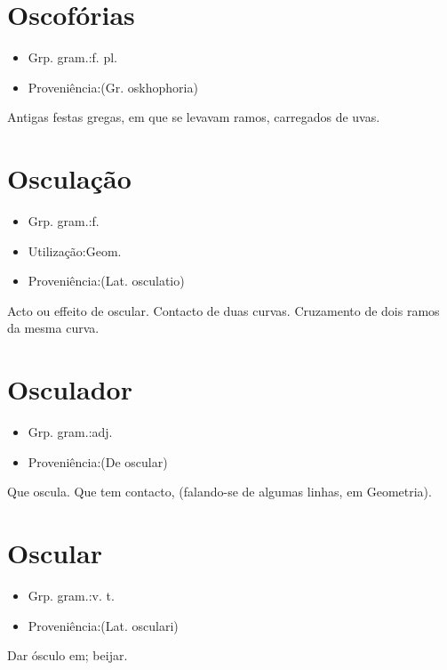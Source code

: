 \section{Oscofórias}
\begin{itemize}
\item {Grp. gram.:f. pl.}
\end{itemize}
\begin{itemize}
\item {Proveniência:(Gr. \textunderscore oskhophoria\textunderscore )}
\end{itemize}
Antigas festas gregas, em que se levavam ramos, carregados de uvas.
\section{Osculação}
\begin{itemize}
\item {Grp. gram.:f.}
\end{itemize}
\begin{itemize}
\item {Utilização:Geom.}
\end{itemize}
\begin{itemize}
\item {Proveniência:(Lat. \textunderscore osculatio\textunderscore )}
\end{itemize}
Acto ou effeito de oscular.
Contacto de duas curvas.
Cruzamento de dois ramos da mesma curva.
\section{Osculador}
\begin{itemize}
\item {Grp. gram.:adj.}
\end{itemize}
\begin{itemize}
\item {Proveniência:(De \textunderscore oscular\textunderscore )}
\end{itemize}
Que oscula.
Que tem contacto, (falando-se de algumas linhas, em Geometria).
\section{Oscular}
\begin{itemize}
\item {Grp. gram.:v. t.}
\end{itemize}
\begin{itemize}
\item {Proveniência:(Lat. \textunderscore osculari\textunderscore )}
\end{itemize}
Dar ósculo em; beijar.
